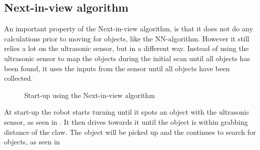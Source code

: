 \subsection{Next-in-view algorithm} \label{sec:niv-algorithm}
An important property of the Next-in-view algorithm, is that it does not do any calculations prior to moving for objects, like the NN-algorithm. However it still relies a lot on the ultrasonic sensor, but in a different way. Instead of using the ultrasonic sensor to map the objects during the initial scan until all objects has been found, it uses the inputs from the sensor until all objects have been collected.

\begin{figure}[H]
     \caption{\label{fig:object_navigation_niv} Start-up using the Next-in-view algorithm}
\end{figure}

At start-up the robot starts turning until it spots an object with the ultrasonic sensor, as seen in . It then drives towards it until the object is within grabbing distance of the claw. The object will be picked up and the \projname{} continues to search for objects, as seen in 


